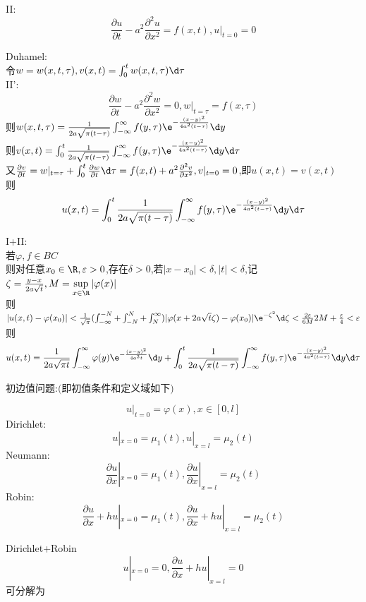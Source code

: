 II:\[\frac{\partial u}{\partial t}-a^2\frac{\partial^2u}{\partial x^2}=f(x,t),u|_{t=0}=0\]

\begin{jie}
Duhamel:\\
令$w=w(x,t,\tau),v(x,t)=\int_{0}^{t}w(x,t,\tau)\d\tau$\\

\rm{II}':
\[\frac{\partial w}{\partial t}-a^2\frac{\partial^2 w}{\partial x^2}=0,w|_{t=\tau}=f(x,\tau)\]
则$w(x,t,\tau)=\frac{1}{2a\sqrt{\pi (t-\tau)}}\int_{-\infty}^{\infty}f(y,\tau)\e^{-\frac{(x-y)^2}{4a^2(t-\tau)}}\d y$\\
则$v(x,t)=\int_{0}^{t}\frac{1}{2a\sqrt{\pi (t-\tau)}}\int_{-\infty}^{\infty}f(y,\tau)\e^{-\frac{(x-y)^2}{4a^2(t-\tau)}}\d y\d \tau$\\
又$\frac{\partial v}{\partial t}=w|_{t=\tau}+\int_{0}^{t}\frac{\partial w}{\partial t}\d\tau=f(x,t)+a^2\frac{\partial^2 v}{\partial x^2},v|_{t=0}=0$,即$u(x,t)=v(x,t)$\\
则\[u(x,t)=\int_{0}^{t}\frac{1}{2a\sqrt{\pi (t-\tau)}}\int_{-\infty}^{\infty}f(y,\tau)\e^{-\frac{(x-y)^2}{4a^2(t-\tau)}}\d y\d \tau\]
\end{jie}

I+II:\\
若$\varphi,f\in BC$\\
则对任意$x_0\in\R,\varepsilon>0$,存在$\delta>0$,若$|x-x_0|<\delta,|t|<\delta$,记$\zeta=\frac{y-x}{2a\sqrt{t}},M=\sup\limits_{x\in\R}|\varphi(x)|$\\
则$|u(x,t)-\varphi(x_0)|<\frac{1}{\sqrt{\pi}}(\int_{-\infty}^{-N}+\int_{-N}^{N}+\int_{N}^{\infty})|\varphi(x+2a\sqrt{t}\zeta)-\varphi(x_0)|\e^{-\zeta^2}\d\zeta<\frac{2\varepsilon}{6M}2M+\frac{\varepsilon}{4}<\varepsilon$\\
则\[u(x,t)=\frac{1}{2a\sqrt{\pi t}}\int_{-\infty}^{\infty}\varphi(y)\e^{-\frac{(x-y)^2}{4a^2t}}\d y+\int_{0}^{t}\frac{1}{2a\sqrt{\pi (t-\tau)}}\int_{-\infty}^{\infty}f(y,\tau)\e^{-\frac{(x-y)^2}{4a^2(t-\tau)}}\d y\d \tau\]

初边值问题:$($即初值条件和定义域如下$)$

\[u|_{t=0}=\varphi(x),x\in[0,l]\]
Dirichlet:
\[u|_{x=0}=\mu_1(t),u|_{x=l}=\mu_2(t)\] 
Neumann:
\[\frac{\partial u}{\partial x}|_{x=0}=\mu_1(t),\frac{\partial u}{\partial x}|_{x=l}=\mu_2(t)\] 
Robin:
\[\frac{\partial u}{\partial x}+h u|_{x=0}=\mu_1(t),\frac{\partial u}{\partial x}+h u|_{x=l}=\mu_2(t)\] 

Dirichlet+Robin
\[u|_{x=0}=0,\frac{\partial u}{\partial x}+h u|_{x=l}=0\] 
可分解为

